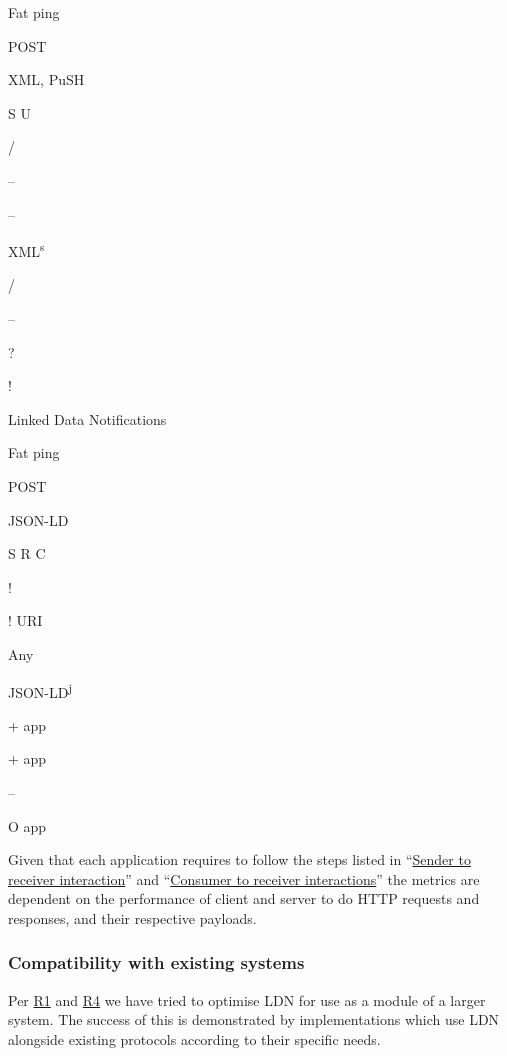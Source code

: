 \documentclass[]{article}
\begin{document}
Fat ping

POST

XML, PuSH

S U

/

--

--

XML\textsuperscript{s}

/

--

?

!

Linked Data Notifications

Fat ping

POST

JSON-LD

S R C

!

! URI

Any

JSON-LD\textsuperscript{j}

+ app

+ app

--

O app

Given that each application requires to follow the steps listed in
``\protect\hyperlink{sender-to-receiver}{Sender to receiver
interaction}'' and ``\protect\hyperlink{consumer-to-receiver}{Consumer
to receiver interactions}'' the metrics are dependent on the performance
of client and server to do HTTP requests and responses, and their
respective payloads.

\hypertarget{compatibility-with-existing-systems}{}
\subsubsection{Compatibility with existing
systems}\label{compatibility-with-existing-systems}

Per \protect\hyperlink{modularity}{R1} and
\protect\hyperlink{adaptability}{R4} we have tried to optimise LDN for
use as a module of a larger system. The success of this is demonstrated
by implementations which use LDN alongside existing protocols according
to their specific needs.
\end{document}
